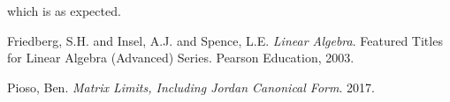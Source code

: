 \documentclass{amsart}
\theoremstyle{definition}
\theoremstyle{remark}
\numberwithin{equation}{section}
\begin{document}
which is as expected.




\begin{thebibliography}{9}

Friedberg, S.H. and Insel, A.J. and Spence, L.E.
\textit{Linear Algebra}.
Featured Titles for Linear Algebra (Advanced) Series.
Pearson Education,
2003.

Pioso, Ben.
\textit{Matrix Limits, Including Jordan Canonical Form}.
2017.

\end{thebibliography}
\end{document}
